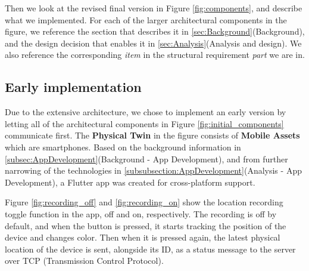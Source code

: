 \documentclass{article}
\begin{document}
Then we look at the revised final version in Figure \ref{fig:components}, and describe what we implemented. For each of the larger architectural components in the figure, we reference the section that describes it in \ref{sec:Background}(Background), and the design decision that enables it in \ref{sec:Analysis}(Analysis and design). We also reference the corresponding \emph{item} in the structural requirement \emph{part} we are in.

\subsection{Early implementation}\label{subsec:EarlyImplementation}
Due to the extensive architecture, we chose to implement an early version by letting all of the architectural components in Figure \ref{fig:initial_components} communicate first. The \textbf{Physical Twin} in the figure consists of \textbf{Mobile Assets} which are smartphones. Based on the background information in \ref{subsec:AppDevelopment}(Background - App Development), and from further narrowing of the technologies in \ref{subsubsection:AppDevelopment}(Analysis - App Development), a Flutter app was created for cross-platform support.

Figure \ref{fig:recording_off} and \ref{fig:recording_on} show the location recording toggle function in the app, off and on, respectively. The recording is off by default, and when the button is pressed, it starts tracking the position of the device and changes color. Then when it is pressed again, the latest physical location of the device is sent, alongside its ID, as a status message to the server over TCP (Transmission Control Protocol).
\end{document}
